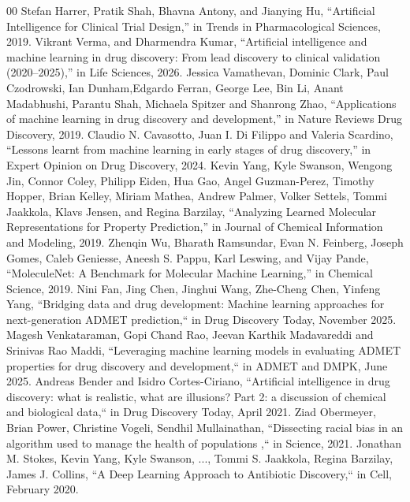 \documentclass[conference]{IEEEtran}
\begin{document}
\begin{thebibliography}{00}
 Stefan Harrer, Pratik Shah, Bhavna Antony, and Jianying Hu, ``Artificial Intelligence for Clinical Trial Design,'' in Trends in Pharmacological Sciences, 2019.
 Vikrant Verma, and Dharmendra Kumar, ``Artificial intelligence and machine learning in drug discovery: From lead discovery to clinical validation (2020–2025),'' in Life Sciences, 2026.
 Jessica Vamathevan, Dominic Clark, Paul Czodrowski, Ian Dunham,Edgardo Ferran, George Lee, Bin Li, Anant Madabhushi, Parantu Shah,
Michaela Spitzer and Shanrong Zhao, ``Applications of machine learning in drug discovery and development,'' in Nature Reviews Drug Discovery, 2019.
 Claudio N. Cavasotto, Juan I. Di Filippo and Valeria Scardino, ``Lessons learnt from machine learning in early stages of drug discovery,'' in Expert Opinion on Drug Discovery, 2024.
 Kevin Yang, Kyle Swanson, Wengong Jin, Connor Coley, Philipp Eiden, Hua Gao, Angel Guzman-Perez, Timothy Hopper, Brian Kelley, Miriam Mathea, Andrew Palmer, Volker Settels, Tommi Jaakkola, Klavs Jensen, and Regina Barzilay, ``Analyzing Learned Molecular Representations for Property
Prediction,'' in Journal of Chemical Information and Modeling, 2019.
 Zhenqin Wu, Bharath Ramsundar, Evan N. Feinberg, Joseph Gomes, Caleb Geniesse, Aneesh S. Pappu, Karl Leswing, and Vijay Pande, ``MoleculeNet: A Benchmark for Molecular Machine Learning,'' in Chemical Science, 2019.
 Nini Fan, Jing Chen, Jinghui Wang, Zhe-Cheng Chen, Yinfeng Yang, ``Bridging data and drug development: Machine learning approaches for next-generation ADMET prediction,`` in Drug Discovery Today, November 2025.
 Magesh Venkataraman, Gopi Chand Rao, Jeevan Karthik Madavareddi and Srinivas Rao Maddi, ``Leveraging machine learning models in evaluating ADMET properties for drug discovery and development,`` in ADMET and DMPK, June 2025.
 Andreas Bender and Isidro Cortes-Ciriano, ``Artificial intelligence in drug discovery: what is realistic, what are illusions? Part 2: a discussion of chemical and biological data,`` in Drug Discovery Today, April 2021.
 Ziad Obermeyer, Brian Power, Christine Vogeli, Sendhil Mullainathan, ``Dissecting racial bias in an algorithm used to manage
the health of populations ,`` in Science, 2021.
 Jonathan M. Stokes, Kevin Yang, Kyle Swanson, ..., Tommi S. Jaakkola, Regina Barzilay, James J. Collins, ``A Deep Learning Approach to Antibiotic Discovery,`` in Cell, February 2020.
\end{thebibliography}
\end{document}
